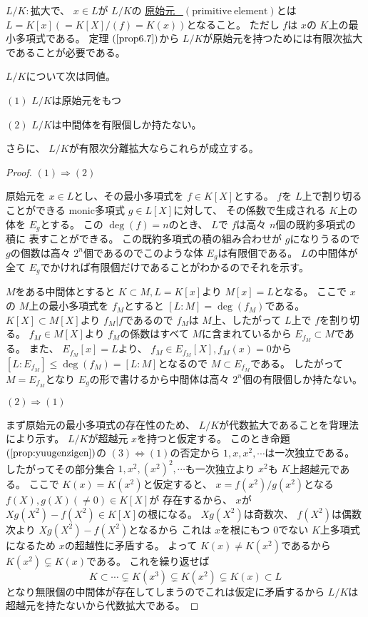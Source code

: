 \documentclass[../master_galois_theory]{subfiles}
\begin{document}
\begin{defi}
  $L/K:$拡大で、 $x \in L$が $L/K$の
  \underline{原始元 \  $(\mathrm{primitive \  element})$}とは
  $L = K[x] (=K[X]/(f) = K(x))$となること。
  ただし $f$は $x$の $K$上の最小多項式である。
  定理 $(\mathrm{\ref{prop6.7}})$から $L/K$が原始元を持つためには有限次拡大であることが必要である。
\end{defi}

\begin{theo}
  $L/K$について次は同値。

  $(1)$
  $L/K$は原始元をもつ

  $(2)$
  $L/K$は中間体を有限個しか持たない。

  さらに、 $L/K$が有限次分離拡大ならこれらが成立する。
\end{theo}

\begin{proof}
  $(1) \Rightarrow (2)$

  原始元を $x \in L$とし、その最小多項式を $f \in K[X]$とする。
  $f$を $L$上で割り切ることができる \rm{monic}多項式 $g \in L[X]$に対して、
  その係数で生成される $K$上の体を $E_g$とする。
  この $\deg(f) = n$のとき、 $L$で $f$は高々 $n$個の既約多項式の積に
  表すことができる。
  この既約多項式の積の組み合わせが $g$になりうるので
  $g$の個数は高々 $2^n$個であるのでこのような体 $E_g$は有限個である。
  $L$の中間体が全て $E_g$でかければ有限個だけであることがわかるのでそれを示す。

  $M$をある中間体とすると $K \subset M , L = K[x]$より $M[x] = L$となる。
  ここで $x$の $M$上の最小多項式を $f_M$とすると $[L:M] = \deg(f_M)$である。
  $K[X] \subset M[X]$より $f_M | f$であるので $f_M$は
  $M$上、したがって $L$上で $f$を割り切る。
  $f_M \in M[X]$より $f_M$の係数はすべて $M$に含まれているから
  $E_{f_M} \subset M$である。
  また、 $E_{f_M}[x] = L$より、 $f_M \in E_{f_M}[X] , f_M(x) = 0$から
  $[L:E_{f_M}] \leq \deg(f_M) = [L:M]$となるので $M \subset E_{f_M}$である。
  したがって $M = E_{f_M}$となり $E_g$の形で書けるから中間体は高々 $2^n$個の有限個しか持たない。

  $(2) \Rightarrow (1)$

  まず原始元の最小多項式の存在性のため、
  $L/K$が代数拡大であることを背理法により示す。
  $L/K$が超越元 $x$を持つと仮定する。
  このとき命題 $(\mathrm{\ref{prop:yuugenzigen}})$の $(3) \Leftrightarrow (1)$の否定から
  $1 , x , x^2 , \cdots$は一次独立である。
  したがってその部分集合 $1 , x^2 , (x^2)^2 , \cdots$も一次独立より
  $x^2$も $K$上超越元である。
  ここで $K(x) = K(x^2)$と仮定すると、
  $x = f(x^2)/g(x^2)$となる $f(X) , g(X) (\neq 0) \in K[X]$が
  存在するから、 $x$が $X g(X^2) - f(X^2) \in K[X]$の根になる。
  $X g(X^2)$は奇数次、 $f(X^2)$は偶数次より $X g(X^2) - f(X^2)$となるから
  これは $x$を根にもつ $0$でない $K$上多項式になるため $x$の超越性に矛盾する。
  よって $K(x) \neq K(x^2)$であるから $K(x^2) \subsetneq K(x)$である。
  これを繰り返せば
  \[
  K \subset \cdots \subsetneq K(x^3) \subsetneq K(x^2) \subsetneq K(x) \subset L
  \]
  となり無限個の中間体が存在してしまうのでこれは仮定に矛盾するから
  $L/K$は超越元を持たないから代数拡大である。


\end{proof}
\end{document}
